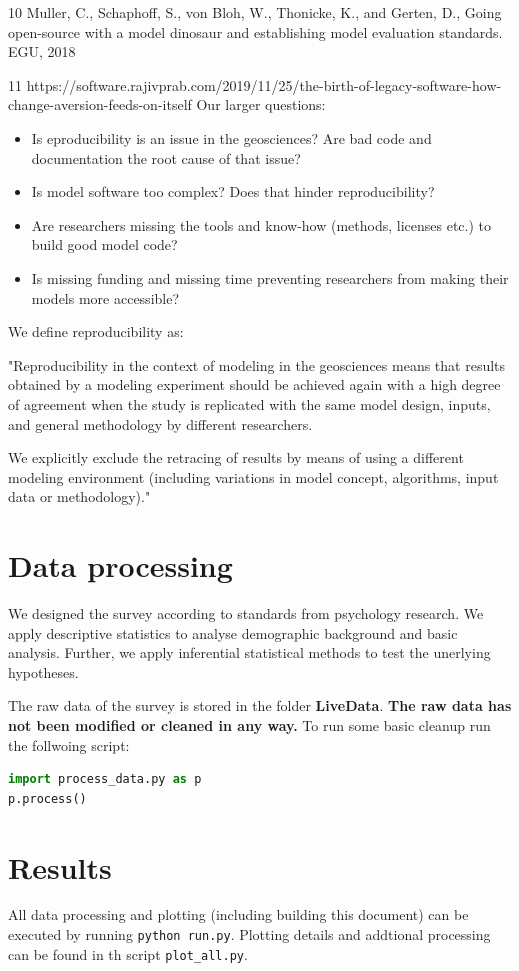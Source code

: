 \documentclass{article}
\begin{document}
10 Muller, C., Schaphoff, S., von Bloh, W., Thonicke, K., and Gerten, D., Going open-source with a model dinosaur and establishing model evaluation standards. EGU, 2018

11 https://software.rajivprab.com/2019/11/25/the-birth-of-legacy-software-how-change-aversion-feeds-on-itself
Our larger questions:
\begin{itemize}
	\item Is eproducibility is an issue in the geosciences? Are bad code and documentation the root cause of that issue?
	\item Is model software too complex? Does that hinder reproducibility?
	\item Are researchers missing the tools and know-how (methods, licenses etc.) to build good model code?
	\item Is missing funding and missing time preventing researchers from making their models more accessible?
\end{itemize}

We define reproducibility as:

"Reproducibility in the context of modeling in the geosciences means that results obtained by a modeling experiment should be achieved again with a high degree of agreement when the study is replicated with the same model design, inputs, and general methodology by different researchers.

We explicitly exclude the retracing of results by means of using a different modeling environment (including variations in model concept, algorithms, input data or methodology)."

\section{Data processing}
We designed the survey according to standards from psychology research. We apply descriptive statistics to analyse demographic background and basic analysis.
Further, we apply inferential statistical methods to test the unerlying hypotheses.

The raw data of the survey is stored in the folder \textbf{LiveData}. \textbf{The raw data has not been modified or cleaned in any way.}
To run some basic cleanup run the follwoing script: 

\begin{lstlisting}[language=Python]
import process_data.py as p
p.process()
\end{lstlisting}

\section{Results}
All data processing and plotting (including building this document) can be executed by running \lstinline{python run.py}.
Plotting details and addtional processing can be found in th script \lstinline{plot_all.py}.
\end{document}
